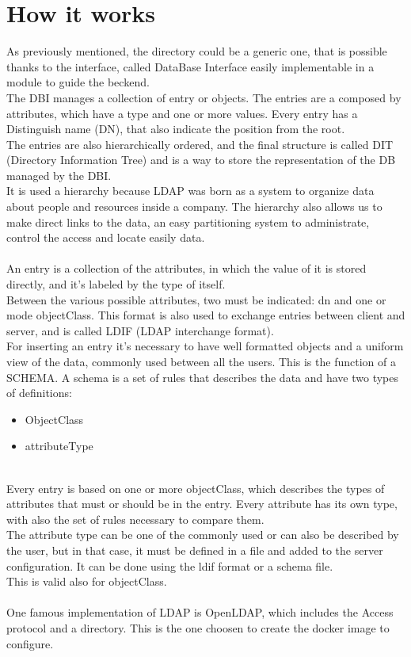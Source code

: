 \section{How it works}
As previously mentioned, the directory could be a generic one, that is possible thanks to the interface, called DataBase Interface easily implementable in a module to guide the beckend. 
\\
The DBI manages a collection of entry or objects. The entries are a composed by attributes, which have a type and one or more values. Every entry has a Distinguish name (DN), that also indicate the position from the root.
\\
The entries are also hierarchically ordered, and the final structure is called DIT (Directory Information Tree) and is a way to store the representation of the DB managed by the DBI.
\\
It is used a hierarchy because LDAP was born as a system to organize data about people and resources inside a company. The hierarchy also allows us to make direct links to the data, an easy partitioning system to administrate, control the access and locate easily data. 
\\\\
An entry is a collection of the attributes, in which the value of it is stored directly, and it’s labeled by the type of itself.
\\
Between the various possible attributes, two must be indicated: dn and one or mode objectClass. This format is also used to exchange entries between client and server, and is called LDIF (LDAP interchange format). 
\\
For inserting an entry it’s necessary to have well formatted objects and a uniform view of the data, commonly used between all the users. This is the function of a SCHEMA. A schema is a set of rules that describes the data and have two types of definitions: 
\begin{itemize}
    \item ObjectClass 
    \item attributeType 
\end{itemize}
\\
Every entry is based on one or more objectClass, which describes the types of attributes that must or should be in the entry.  Every attribute has its own type, with also the set of rules necessary to compare them. 
\\
The attribute type can be one of the commonly used or can also be described by the user, but in that case, it must be defined in a file and added to the server configuration. It can be done using the ldif format or a schema file.
\\
This is valid also for objectClass.
\\\\
One famous implementation of LDAP is OpenLDAP, which includes the Access protocol and a directory. This is the one choosen to create the docker image to configure.
